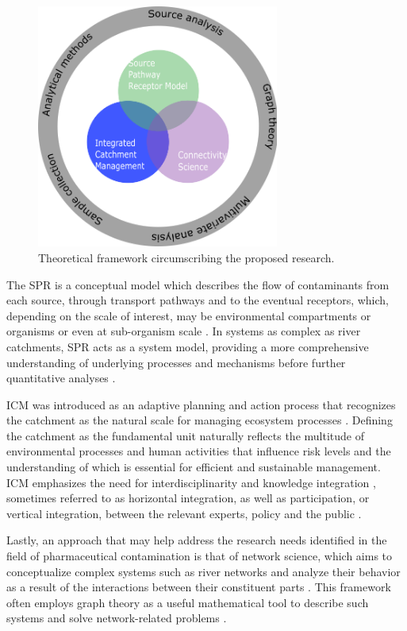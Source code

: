 \documentclass{article}
\begin{document}
\begin{figure}[h]
    \centering
    \includegraphics[height=8cm]{fig_framework.png}
    \caption{Theoretical framework circumscribing the proposed research.}
    \label{fig_framework}
\end{figure}

The SPR is a conceptual model which describes the flow of contaminants from each source, through transport pathways  and to the eventual receptors, which, depending on the scale of interest, may be environmental compartments or organisms or even at sub-organism scale \citep{Holdgate1979APollution.}. In systems as complex as river catchments, SPR acts as a system model, providing a more comprehensive understanding of underlying processes and mechanisms before further quantitative analyses \citep{Narayan2012SystemConcept,Waldschlager2020Thereview}. 

ICM was introduced as an adaptive planning and action process that recognizes the catchment as the natural scale for managing ecosystem processes \citep{Fenemor2011IntegratedKnowledge}. Defining the catchment as the fundamental unit naturally reflects the multitude of environmental processes and human activities that influence risk levels and the understanding of which is essential for efficient and sustainable management. ICM emphasizes the need for interdisciplinarity and knowledge integration \citep{Voulvoulis2012WaterApproach}, sometimes referred to as horizontal integration, as well as participation, or vertical integration, between the relevant experts, policy and the public \citep{Rollason2018EvaluatingManagement}. 

Lastly, an approach that may help address the research needs identified in the field of pharmaceutical contamination is that of network science, which aims to conceptualize complex systems such as river networks and analyze their behavior as a result of the interactions between their constituent parts \citep{Bullmore2009ComplexSystems}. This framework often employs graph theory as a useful mathematical tool to describe such systems and solve network-related problems \citep{Anderson2020ComplexApplications,Phillips2015GraphGeosciences}. 
\end{document}
